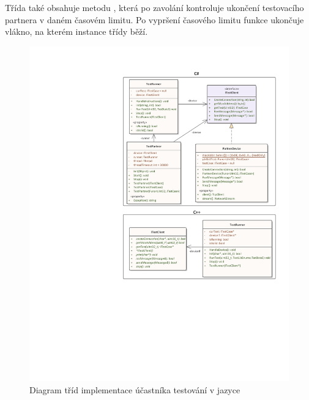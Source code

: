 Třída také obsahuje metodu , která po zavolání kontroluje ukončení testovacího partnera v daném časovém limitu. Po vypršení časového limitu funkce ukončuje vlákno, na kterém instance třídy  běží.

\begin{figure}[H]
    \centering 
    \includegraphics[width=\textwidth]{assets/img/class_diagram/client-cpp.pdf}
    \caption{Diagram tříd implementace účastníka testování v jazyce \protect\cpp{}}
    \label{fig:test_client_cpp}
\end{figure}

